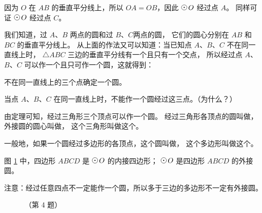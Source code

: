 因为 $O$ 在 $AB$ 的垂直平分线上，所以 $OA = OB$，因此 $\yuan\,O$ 经过点 $A$。
同样可证 $\yuan\,O$ 经过点 $C$。

我们知道，过 $A$、$B$ 两点的圆和过 $B$、$C$两点的圆， 它们的圆心分别在 $AB$ 和 $BC$ 的垂直平分线上。
从上面的作法又可以知道：当已知点 $A$、$B$、$C$ 不在同一直线上时，
$\triangle ABC$ 三边的垂直平分线有一个且只有一个交点，
所以经过点 $A$、$B$、$C$ 可以作一个且只可作一个圆，这就得到：

\begin{dingli}[定理]
    不在同一直线上的三个点确定一个圆。
\end{dingli}

当点 $A$、$B$、$C$ 在同一直线上时，不能作一个圆经过这三点。（为什么？）

由定理可知，经过三角形三个顶点可以作一个圆。
经过三角形各顶点的圆叫做，
外接圆的圆心叫做，
这个三角形叫做这个。

一般地，如果一个圆经过多边形的各顶点，这个圆叫做，
这个多边形叫做这个。

图 \ref{fig:czjh2-7-10} 中，四边形 $ABCD$ 是 $\yuan\,O$ 的内接四边形；
$\yuan\,O$ 是四边形 $ABCD$ 的外接圆。

注意：经过任意四点不一定能作一个圆，所以多于三边的多边形不一定有外接圆。

\begin{figure}[htbp]
    \centering
    \begin{minipage}[b]{4cm}
        \centering
        
        \caption{}\label{fig:czjh2-7-10}
    \end{minipage}
    \qquad
    \begin{minipage}[b]{5cm}
        \centering
        
        \caption*{（第 1 题）}
    \end{minipage}
    \qquad
    \begin{minipage}[b]{4.5cm}
        \centering
        
        \caption*{（第 4 题）}
    \end{minipage}
\end{figure}

